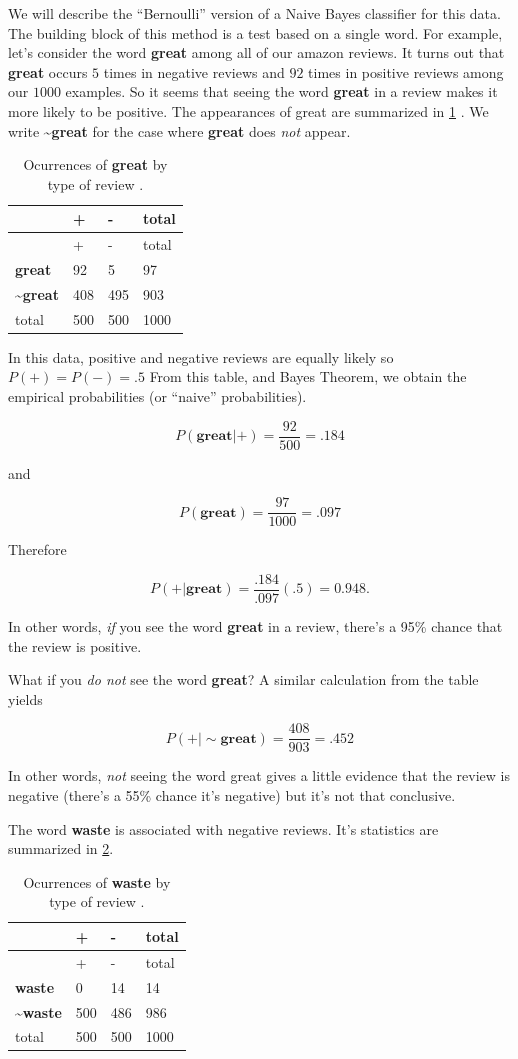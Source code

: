 \documentclass[
]{article}
\begin{document}
We will describe the ``Bernoulli'' version of a Naive Bayes classifier
for this data. The building block of this method is a test based on a
single word. For example, let's consider the word \textbf{great} among
all of our amazon reviews. It turns out that \textbf{great} occurs \(5\)
times in negative reviews and \(92\) times in positive reviews among our
\(1000\) examples. So it seems that seeing the word \textbf{great} in a
review makes it more likely to be positive. The appearances of great are
summarized in \cref{tbl:great} . We write
\textasciitilde{}\textbf{great} for the case where \textbf{great} does
\emph{not} appear.

\begin{longtable}[]{@{}llll@{}}
\caption{Ocurrences of \textbf{great} by type of review
.\label{tbl:great}}\tabularnewline
\toprule
& + & - & total\tabularnewline
\midrule
\endfirsthead
\toprule
& + & - & total\tabularnewline
\midrule
\endhead
\textbf{great} & 92 & 5 & 97\tabularnewline
\textasciitilde{}\textbf{great} & 408 & 495 & 903\tabularnewline
total & 500 & 500 & 1000\tabularnewline
\bottomrule
\end{longtable}

In this data, positive and negative reviews are equally likely so
\(P(+)=P(-)=.5\) From this table, and Bayes Theorem, we obtain the
empirical probabilities (or ``naive'' probabilities).

\[
P(\mathbf{great} | +) = \frac{92}{500} = .184
\]

and

\[
P(\mathbf{great}) = \frac{97}{1000} = .097
\]

Therefore

\[
P(+|\mathbf{great}) = \frac{.184}{.097}(.5) = 0.948.
\]

In other words, \emph{if} you see the word \textbf{great} in a review,
there's a 95\% chance that the review is positive.

What if you \emph{do not} see the word \textbf{great}? A similar
calculation from the table yields

\[
P(+|\sim\mathbf{great}) = \frac{408}{903} = .452
\]

In other words, \emph{not} seeing the word great gives a little evidence
that the review is negative (there's a 55\% chance it's negative) but
it's not that conclusive.

The word \textbf{waste} is associated with negative reviews. It's
statistics are summarized in \cref{tbl:waste}.

\begin{longtable}[]{@{}llll@{}}
\caption{Ocurrences of \textbf{waste} by type of review
.\label{tbl:waste}}\tabularnewline
\toprule
& + & - & total\tabularnewline
\midrule
\endfirsthead
\toprule
& + & - & total\tabularnewline
\midrule
\endhead
\textbf{waste} & 0 & 14 & 14\tabularnewline
\textasciitilde{}\textbf{waste} & 500 & 486 & 986\tabularnewline
total & 500 & 500 & 1000\tabularnewline
\bottomrule
\end{longtable}
\end{document}
